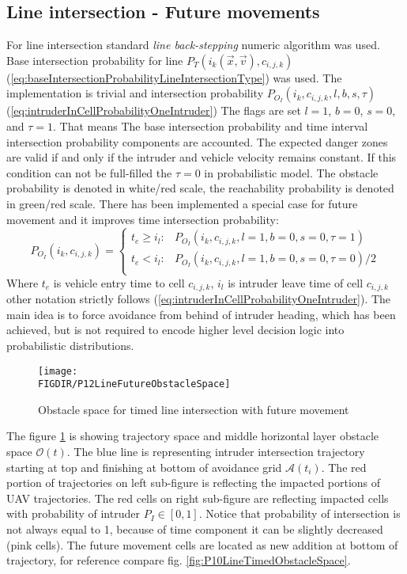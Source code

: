 \subsection{Line intersection - Future movements}
\noindent For line intersection standard \emph{line back-stepping} numeric algorithm was used. Base intersection probability for line $P_T(i_k(\vec{x},\vec{v}),c_{i,j,k})$  (\ref{eq:baseIntersectionProbabilityLineIntersectionType}) was used. The implementation is trivial and intersection probability $P_{O_I}(i_k,c_{i,j,k},l,b,s,\tau)$ (\ref{eq:intruderInCellProbabilityOneIntruder}) The flags are set $l=1$, $b=0$, $s=0$, and $\tau=1$. That means The base intersection probability and time interval intersection probability components are accounted. The expected danger zones are valid if and only if the intruder and vehicle velocity remains constant. If this condition can not be full-filled the $\tau=0$ in probabilistic model. The obstacle probability is denoted in white/red scale, the reachability probability is denoted in green/red scale. There has been implemented a special case for future movement and it improves time intersection probability:
\begin{equation}
    P_{O_I}(i_k,c_{i,j,k})=
    \begin{cases}
    t_e\ge i_l :& P_{O_I}(i_k,c_{i,j,k},l=1,b=0,s=0,\tau=1)\\
    t_e < i_l  :& P_{O_I}(i_k,c_{i,j,k},l=1,b=0,s=0,\tau=0)/2\\
    \end{cases}
\end{equation}
\noindent Where $t_e$ is vehicle entry time to cell $c_{i,j,k}$, $i_l$ is intruder leave time of cell $c_{i,j,k}$ other notation strictly follows (\ref{eq:intruderInCellProbabilityOneIntruder}). The main idea is to force avoidance from behind of intruder heading, which has been achieved, but is not required to encode higher level decision logic into probabilistic distributions.


\begin{figure}[H]
    \centering
    \texttt{[image: \\FIGDIR/P12LineFutureObstacleSpace]}
    \caption{Obstacle space for timed line intersection with future movement}
    \label{fig:P12LineFutureObstacleSpace}
\end{figure}


\noindent The figure \ref{fig:P12LineFutureObstacleSpace} is showing trajectory space and middle horizontal layer obstacle space $\mathscr{O}(t)$. The blue line is representing intruder intersection trajectory starting at top and finishing at bottom of avoidance grid $\mathscr{A}(t_i)$. The red portion of trajectories on left sub-figure is reflecting the impacted portions of UAV trajectories. The red cells on right sub-figure are reflecting impacted cells with probability of intruder $P_I\in [0,1]$. Notice that probability of intersection is not always equal to 1, because of time component it can be slightly decreased (pink cells). The future movement cells are located as new addition at bottom of trajectory, for reference compare fig. \ref{fig:P10LineTimedObstacleSpace}.

